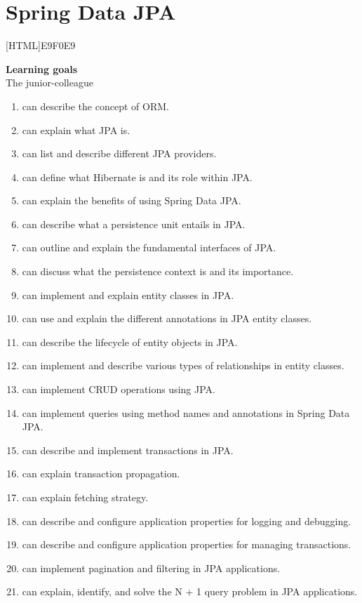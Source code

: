 \chapter{Spring Data JPA}

[HTML]{E9F0E9}{\parbox{\textwidth}{%
\noindent \textbf{Learning goals}\\
The junior-colleague
\begin{enumerate}[nolistsep]
\item can describe the concept of ORM.
\item can explain what JPA is.
\item can list and describe different JPA providers.
\item can define what Hibernate is and its role within JPA.
\item can explain the benefits of using Spring Data JPA.
\item can describe what a persistence unit entails in JPA.
\item can outline and explain the fundamental interfaces of JPA.
\item can discuss what the persistence context is and its importance.
\item can implement and explain entity classes in JPA.
\item can use and explain the different annotations in JPA entity classes.
\item can describe the lifecycle of entity objects in JPA.
\item can implement and describe various types of relationships in entity classes.
\item can implement CRUD operations using JPA.
\item can implement queries using method names and annotations in Spring Data JPA.
\item can describe and implement transactions in JPA.
\item can explain transaction propagation.
\item can explain fetching strategy.
\item can describe and configure application properties for logging and debugging.
\item can describe and configure application properties for managing transactions.
\item can implement pagination and filtering in JPA applications.
\item can explain, identify, and solve the N + 1 query problem in JPA applications.
\end{enumerate}}}

